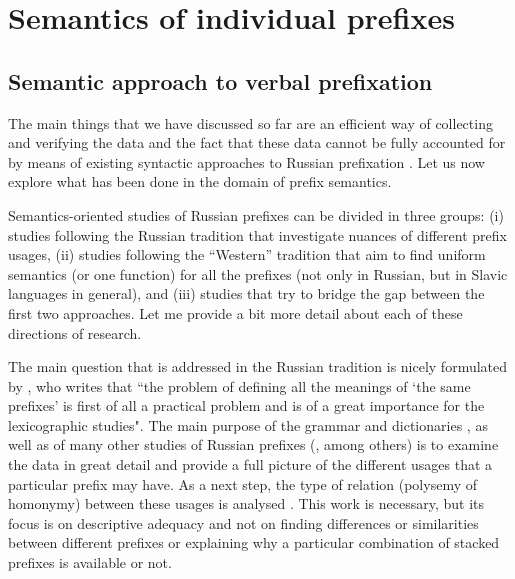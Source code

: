 

\chapter{Semantics of individual prefixes} %
\label{Chapter5}
\section{Semantic approach to verbal prefixation }
The main things that we have discussed so far are an efficient way of collecting and verifying the data and the fact that these data cannot be fully accounted for by means of existing syntactic approaches to Russian prefixation . Let us now explore what has been done in the domain of prefix semantics.

Semantics-oriented studies of Russian prefixes can be divided in three groups: (i) studies following the Russian tradition that investigate nuances of different prefix usages, (ii) studies following the ``Western'' tradition that aim to find uniform semantics (or one function) for all the prefixes (not only in Russian, but in Slavic languages in general), and (iii) studies that try to bridge the gap between the first two approaches. Let me provide a bit more detail about each of these directions of research.

The main question that is addressed in the Russian tradition is nicely formulated by \citet[18]{Boguslawski:63}, who writes that ``the problem of defining all the meanings of `the same prefixes' is first of all a practical problem and is of a great importance for the lexicographic studies". The main purpose of the grammar \citep{Grammar:52, Shvedova:82} and dictionaries \citep{Dict:50, Dict:57}, as well as of many other studies of Russian prefixes (\citealt{Avilova:64, Golovin:59, Lopatin:97, Tixonov:98}, among others) is to examine the data in great detail and provide a full picture of the different usages that a particular prefix may have. As a next step, the type of relation (polysemy of homonymy) between these usages is analysed \citep{Krongauz:97, Plungyan:01}. This work is necessary, but its focus is on descriptive adequacy and not on finding differences or similarities between different prefixes or explaining why a particular combination of stacked prefixes is available or not.

